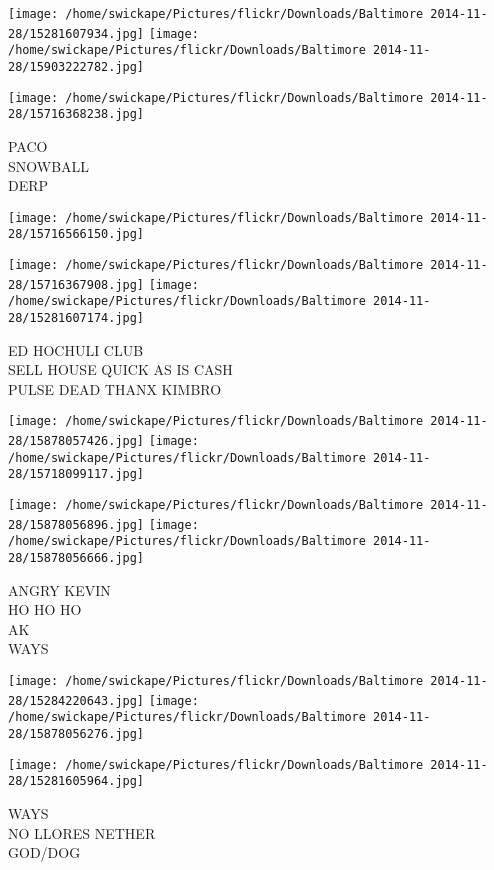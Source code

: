 \documentclass[10pt,letterpaper]{article}
\begin{document}
\texttt{[image: /home/swickape/Pictures/flickr/Downloads/Baltimore 2014-11-28/15281607934.jpg]}
\texttt{[image: /home/swickape/Pictures/flickr/Downloads/Baltimore 2014-11-28/15903222782.jpg]}

\texttt{[image: /home/swickape/Pictures/flickr/Downloads/Baltimore 2014-11-28/15716368238.jpg]}

PACO\\
SNOWBALL\\
DERP
\pagebreak

\texttt{[image: /home/swickape/Pictures/flickr/Downloads/Baltimore 2014-11-28/15716566150.jpg]}

\vspace{0.25in}
\texttt{[image: /home/swickape/Pictures/flickr/Downloads/Baltimore 2014-11-28/15716367908.jpg]}
\texttt{[image: /home/swickape/Pictures/flickr/Downloads/Baltimore 2014-11-28/15281607174.jpg]}

ED HOCHULI CLUB\\
SELL HOUSE QUICK AS IS CASH\\
PULSE DEAD THANX KIMBRO
\pagebreak

\texttt{[image: /home/swickape/Pictures/flickr/Downloads/Baltimore 2014-11-28/15878057426.jpg]}
\texttt{[image: /home/swickape/Pictures/flickr/Downloads/Baltimore 2014-11-28/15718099117.jpg]}

\texttt{[image: /home/swickape/Pictures/flickr/Downloads/Baltimore 2014-11-28/15878056896.jpg]}
\texttt{[image: /home/swickape/Pictures/flickr/Downloads/Baltimore 2014-11-28/15878056666.jpg]}

ANGRY KEVIN\\
HO HO HO\\
AK\\
WAYS
\pagebreak

\texttt{[image: /home/swickape/Pictures/flickr/Downloads/Baltimore 2014-11-28/15284220643.jpg]}
\texttt{[image: /home/swickape/Pictures/flickr/Downloads/Baltimore 2014-11-28/15878056276.jpg]}

\vspace{0.25in}
\texttt{[image: /home/swickape/Pictures/flickr/Downloads/Baltimore 2014-11-28/15281605964.jpg]}

WAYS\\
NO LLORES NETHER\\
GOD/DOG
\pagebreak
\end{document}
